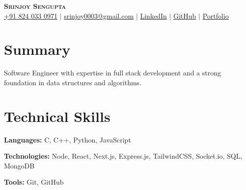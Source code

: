 \documentclass[letterpaper,11pt]{article}
\newcommand{\resumeSubHeadingListStart}{\begin{itemize}[leftmargin=0.15in, label={}]}
\newcommand{\resumeSubHeadingListEnd}{\end{itemize}}
\begin{document}

\begin{center}
    \textbf{\Huge \scshape Srinjoy Sengupta} \\ \vspace{3pt}
    \small
    \faMobile \hspace{.5pt} \href{tel:918240330971}{+91 824 033 0971}
    $|$
    \faAt \hspace{.5pt} \href{srinjoy003@gmail.com}{srinjoy0003@gmail.com}
    $|$
    \faLinkedinSquare \hspace{.5pt} \href{https://linkedin.com/in/srinjoy-sengupta-b28565302}{LinkedIn}
    $|$
    \faGithub \hspace{.5pt} \href{https://github.com/Srinjoy003}{GitHub}
    $|$
    \faGlobe \hspace{.5pt} \href{https://srinjoysengupta.vercel.app/}{Portfolio}
\end{center}


\section{Summary}
  \vspace{2pt}
  \small{
  Software Engineer with expertise in full stack development and a strong foundation in data structures and algorithms.
  }




\section{Technical Skills}
  \vspace{2pt}
  \resumeSubHeadingListStart
    \small{\item{
        
        \textbf{Languages:}{ C, C++, Python, JavaScript} \\ \vspace{3pt}
        
        \textbf{Technologies:}{ Node, React, Next.js, Express.js, TailwindCSS, Socket.io, SQL, MongoDB } \\ \vspace{3pt}
        
        \textbf{Tools:}{ Git, GitHub} \\ \vspace{3pt}
        
    }}
  \resumeSubHeadingListEnd
\end{document}
